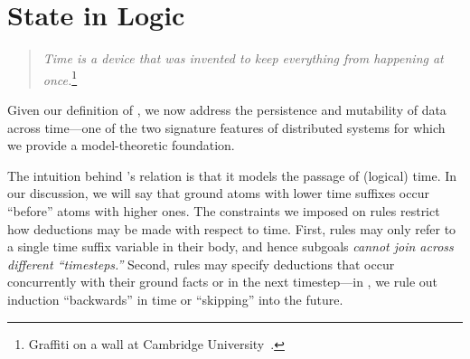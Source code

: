 \section{State in Logic}
\label{sec:stateupdate}





\begin{quote}
%
\emph{Time is a device that was invented to keep everything from
happening at once.}\footnote{Graffiti on a wall at Cambridge
University~\cite{scheme}.}
%
\end{quote} 

Given our definition of \slang, we now address the persistence and mutability
of data across time---one of the two signature features of distributed systems
for which we provide a model-theoretic foundation.

The intuition behind \slang's  relation is that it models the
passage of (logical) time.  In our discussion, we will say that ground atoms
with lower time suffixes occur ``before'' atoms with higher ones.
The constraints we imposed on \slang rules restrict how deductions may be made
with respect to time.  First, rules may only refer to a single time suffix variable in
their body, and hence subgoals {\em cannot join across different ``timesteps.''}  Second, rules may specify
deductions that occur concurrently with their ground facts or in the next
timestep---in \slang, we rule out induction ``backwards'' in time or
``skipping'' into the future.

